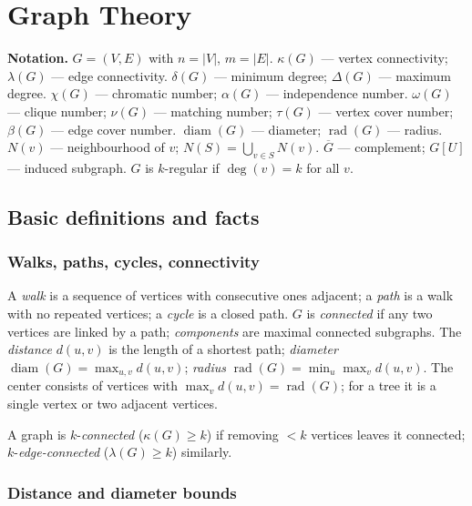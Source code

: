 \chapter{Graph Theory}
\label{ch:graph}

\medskip

\textbf{Notation.} $G=(V,E)$ with $n=|V|$, $m=|E|$.
$\kappa(G)$ --- vertex connectivity; $\lambda(G)$ --- edge connectivity.
$\delta(G)$ --- minimum degree; $\Delta(G)$ --- maximum degree.
$\chi(G)$ --- chromatic number; $\alpha(G)$ --- independence number.
$\omega(G)$ --- clique number; $\nu(G)$ --- matching number; $\tau(G)$ --- vertex cover number; $\beta(G)$ --- edge cover number.
$\operatorname{diam}(G)$ --- diameter; $\operatorname{rad}(G)$ --- radius.
$N(v)$ --- neighbourhood of $v$; $N(S)=\bigcup_{v\in S}N(v)$.
$\overline G$ --- complement; $G[U]$ --- induced subgraph.
$G$ is $k$-regular if $\deg(v)=k$ for all $v$.

\medskip

\section{Basic definitions and facts}
\label{sec:graph-basics}

\subsection{Walks, paths, cycles, connectivity}
\label{subsec:walks-paths}

A \textit{walk} is a sequence of vertices with consecutive ones adjacent; a \textit{path} is a walk with no repeated vertices; a \textit{cycle} is a closed path. $G$ is \textit{connected} if any two vertices are linked by a path; \textit{components} are maximal connected subgraphs. The \textit{distance} $d(u,v)$ is the length of a shortest path; \textit{diameter} $\operatorname{diam}(G)=\max_{u,v}d(u,v)$; \textit{radius} $\operatorname{rad}(G)=\min_u\max_v d(u,v)$. The center consists of vertices with $\max_v d(u,v)=\operatorname{rad}(G)$; for a tree it is a single vertex or two adjacent vertices.

A graph is $k$-\textit{connected} ($\kappa(G)\ge k$) if removing $<k$ vertices leaves it connected; $k$-\textit{edge-connected} ($\lambda(G)\ge k$) similarly.

\subsection{Distance and diameter bounds}
\label{subsec:diameter-bounds}

